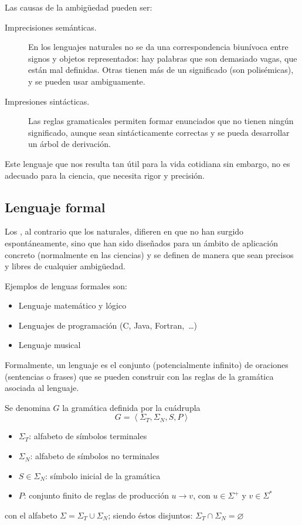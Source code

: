 Las causas de la ambigüedad pueden ser:
\nopagebreak
\begin{description}
\item[Imprecisiones semánticas.] En los lenguajes naturales no se da una correspondencia biunívoca entre signos y objetos representados: hay palabras que son demasiado vagas, que están mal definidas. Otras tienen más de un significado (son polisémicas), y se pueden usar ambiguamente.
\item[Impresiones sintácticas.] Las reglas gramaticales permiten formar enunciados que no tienen ningún significado, aunque sean sintácticamente correctas y se pueda desarrollar un árbol de derivación.
\end{description}

Este lenguaje que nos resulta tan útil para la vida cotidiana sin embargo, no es adecuado para la ciencia, que necesita rigor y precisión. \citep{DiazSantos2015}

\FloatBarrier
\subsection{Lenguaje formal}

Los , al contrario que los naturales, difieren en que no han surgido espontáneamente, sino que han sido diseñados para un ámbito de aplicación concreto (normalmente en las ciencias) y se definen de manera que sean precisos y libres de cualquier ambigüedad.

Ejemplos de lenguas formales son:
\nopagebreak
\begin{itemize}
\item Lenguaje matemático y lógico
\item Lenguajes de programación (C, Java, Fortran,~\ldots)
\item Lenguaje musical
\end{itemize}

Formalmente, un lenguaje es el conjunto (potencialmente infinito) de oraciones (sentencias o frases) que se pueden construir con las reglas de la gramática asociada al lenguaje.

\begin{definition}
\citep{MorenoVelo2010}
Se denomina  $G$ la gramática definida por la cuádrupla
\[
G = \left< \Sigma_T, \Sigma_N, S, P \right>
\]
\begin{itemize}
\item $\Sigma_T$: alfabeto de símbolos terminales
\item $\Sigma_N$: alfabeto de símbolos no terminales
\item $S \in \Sigma_N$: símbolo inicial de la gramática
\item $P$: conjunto finito de reglas de producción $u \rightarrow v$, con $u \in \Sigma^+$ y $v \in \Sigma^*$
\end{itemize}
con el alfabeto $\Sigma = \Sigma_T \cup \Sigma_N$; siendo éstos disjuntos: $\Sigma_T \cap \Sigma_N = \varnothing$
\end{definition}

